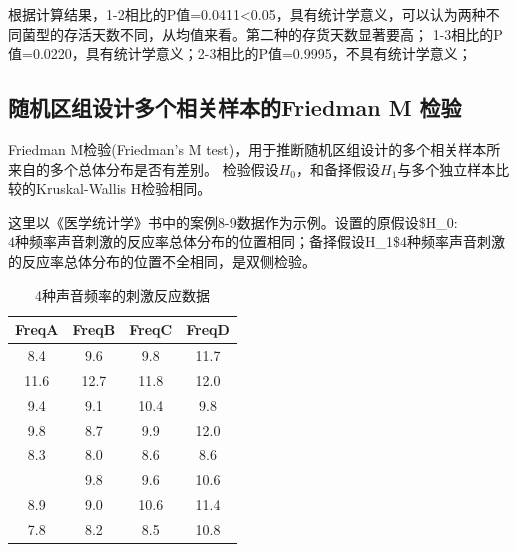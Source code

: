 \documentclass[
]{article}
\newenvironment{Shaded}{\begin{snugshade}}{\end{snugshade}}
\newcommand{\CommentTok}[1]{\textcolor[rgb]{0.56,0.35,0.01}{\textit{#1}}}
\newcommand{\DataTypeTok}[1]{\textcolor[rgb]{0.13,0.29,0.53}{#1}}
\newcommand{\KeywordTok}[1]{\textcolor[rgb]{0.13,0.29,0.53}{\textbf{#1}}}
\newcommand{\NormalTok}[1]{#1}
\newcommand{\OperatorTok}[1]{\textcolor[rgb]{0.81,0.36,0.00}{\textbf{#1}}}
\newcommand{\StringTok}[1]{\textcolor[rgb]{0.31,0.60,0.02}{#1}}
\begin{document}
\begin{Shaded}
\end{Shaded}

根据计算结果，1-2相比的P值=0.0411\textless0.05，具有统计学意义，可以认为两种不同菌型的存活天数不同，从均值来看。第二种的存货天数显著要高；
1-3相比的P值=0.0220，具有统计学意义；2-3相比的P值=0.9995，不具有统计学意义；

\hypertarget{ux968fux673aux533aux7ec4ux8bbeux8ba1ux591aux4e2aux76f8ux5173ux6837ux672cux7684friedman-m-ux68c0ux9a8c}{%
\subsection{随机区组设计多个相关样本的Friedman M 检验}\label{ux968fux673aux533aux7ec4ux8bbeux8ba1ux591aux4e2aux76f8ux5173ux6837ux672cux7684friedman-m-ux68c0ux9a8c}}

Friedman M检验(Friedman's M test)，用于推断随机区组设计的多个相关样本所来自的多个总体分布是否有差别。
检验假设\(H_0\)，和备择假设\(H_1\)与多个独立样本比较的Kruskal-Wallis H检验相同。

这里以《医学统计学》书中的案例8-9数据作为示例。设置的原假设\$H\_0:\(4种频率声音刺激的反应率总体分布的位置相同；备择假设\)H\_1\$4种频率声音刺激的反应率总体分布的位置不全相同，是双侧检验。

\begin{table}

\caption{\label{tab:ranktab4}4种声音频率的刺激反应数据}
\centering
\begin{tabular}[t]{cccc}
\toprule
FreqA & FreqB & FreqC & FreqD\\
\midrule
8.4 & 9.6 & 9.8 & 11.7\\
11.6 & 12.7 & 11.8 & 12.0\\
9.4 & 9.1 & 10.4 & 9.8\\
9.8 & 8.7 & 9.9 & 12.0\\
8.3 & 8.0 & 8.6 & 8.6\\
\addlinespace
8.6 & 9.8 & 9.6 & 10.6\\
8.9 & 9.0 & 10.6 & 11.4\\
7.8 & 8.2 & 8.5 & 10.8\\
\bottomrule
\end{tabular}
\end{table}
\end{document}

